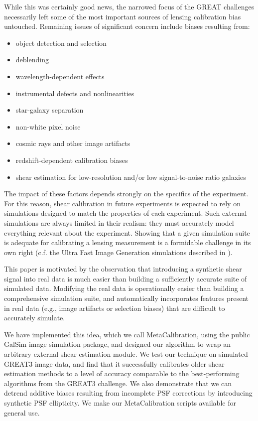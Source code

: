 \documentclass[iop]{emulateapj}
\begin{document}
While this was certainly good news, the narrowed focus of the GREAT
challenges necessarily left some of the most important sources of
lensing calibration bias untouched. Remaining issues of significant
concern include biases resulting from:
\begin{itemize}
\item object detection and selection
\item deblending
\item wavelength-dependent effects
\item instrumental defects and nonlinearities
\item star-galaxy separation
\item non-white pixel noise
\item cosmic rays and other image artifacts
\item redshift-dependent calibration biases
\item shear estimation for low-resolution and/or low signal-to-noise ratio galaxies
\end{itemize}
The impact of these factors depends strongly on the specifics of the
experiment. For this reason, shear calibration in future experiments
is expected to rely on simulations designed to match the properties of
each experiment. Such external simulations are always limited in their
realism: they must accurately model everything relevant about the
experiment. Showing that a given simulation suite is adequate for
calibrating a lensing measurement is a formidable challenge in its own
right (c.f. the Ultra Fast Image Generation simulations described in \citet{2013A&C.....1...23B}).

This paper is motivated by the observation that introducing a
synthetic shear signal into real data is much easier than building a
sufficiently accurate suite of simulated data. Modifying the real data
is operationally easier than building a comprehensive simulation
suite, and automatically incorporates features present in real data
(e.g., image artifacts or selection biases) that are difficult to
accurately simulate.

We have implemented this idea, which we call MetaCalibration, using
the public GalSim \citep{2015A&C....10..121R} image simulation
package, and designed our algorithm to wrap an arbitrary external
shear estimation module. We test our technique on simulated GREAT3
image data, and find that it successfully calibrates older shear
estimation methods to a level of accuracy comparable to the
best-performing algorithms from the GREAT3 challenge. We also
demonstrate that we can detrend additive biases resulting from
incomplete PSF corrections by introducing synthetic PSF ellipticity.
We make our MetaCalibration scripts available for general use.
\end{document}
